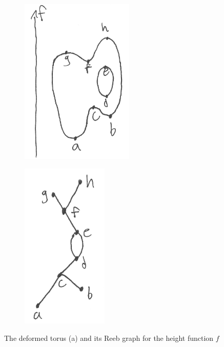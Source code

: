 \documentclass{article}
\begin{document}
\begin{figure}[htb!]
	\centering
	\begin{subfigure}{0.45\columnwidth}
		\centering
		\includegraphics[height=8cm]{fig/blobby-torus}
		\caption{\label{fig:deformed-torus}}
	\end{subfigure}
	\begin{subfigure}{0.45\columnwidth}
		\centering
		\includegraphics[height=8cm]{fig/blobby-torus-reeb-graph}
		\caption{\label{fig:reeb-graph}}
	\end{subfigure}
	\caption{\label{fig:torus-reeb} The deformed torus (a) and its Reeb graph for the
	height function $f$}
\end{figure}
\end{document}
